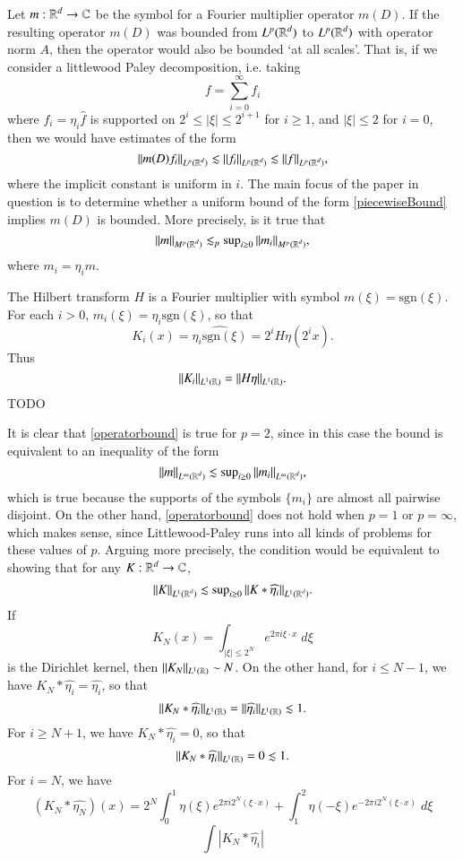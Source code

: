 Let $m: \operatorname{\mathbb{R}}^d \to \operatorname{\mathbb{C}}$ be the symbol for a Fourier multiplier operator $m(D)$. If the resulting operator $m(D)$ was bounded from $L^p(\operatorname{\mathbb{R}}^d)$ to $L^p(\operatorname{\mathbb{R}}^d)$ with operator norm $A$, then the operator would also be bounded `at all scales'. That is, if we consider a littlewood Paley decomposition, i.e. taking
%
\[ f = \sum_{i = 0}^\infty f_i \]
%
where $\widehat{f_i} = \eta_i \widehat{f}$ is supported on $2^i \leq |\xi| \leq 2^{i+1}$ for $i \geq 1$, and $|\xi| \leq 2$ for $i = 0$, then we would have estimates of the form
%
\begin{equation} \label{piecewiseBound}
    \| m(D) f_i \|_{L^p(\operatorname{\mathbb{R}}^d)} \lesssim \| f_i \|_{L^p(\operatorname{\mathbb{R}}^d)} \lesssim \| f \|_{L^p(\operatorname{\mathbb{R}}^d)},
\end{equation}
%
where the implicit constant is uniform in $i$. The main focus of the paper in question is to determine whether a uniform bound of the form \eqref{piecewiseBound} implies $m(D)$ is bounded. More precisely, is it true that
%
\begin{equation} \label{operatorbound}
    \| m \|_{M^p(\operatorname{\mathbb{R}}^d)} \lesssim_p \sup\nolimits_{i \geq 0} \| m_i \|_{M^p(\operatorname{\mathbb{R}}^d)},
\end{equation}
%
where $m_i = \eta_i m$.

The Hilbert transform $H$ is a Fourier multiplier with symbol $m(\xi) = \text{sgn}(\xi)$. For each $i > 0$, $m_i(\xi) = \eta_i \text{sgn}(\xi)$, so that
%
\[ K_i(x) = \widehat{\eta_i \text{sgn}(\xi)} = 2^i H \eta(2^i x). \]
%
Thus
%
\[ \| K_i \|_{L^1(\operatorname{\mathbb{R}})} = \| H \eta \|_{L^1(\operatorname{\mathbb{R}})}. \]
%
TODO

It is clear that \eqref{operatorbound} is true for $p = 2$, since in this case the bound is equivalent to an inequality of the form
%
\[ \| m \|_{L^\infty(\operatorname{\mathbb{R}}^d)} \lesssim \sup\nolimits_{i \geq 0} \| m_i \|_{L^\infty(\operatorname{\mathbb{R}}^d)}, \]
%
which is true because the supports of the symbols $\{ m_i \}$ are almost all pairwise disjoint. On the other hand, \eqref{operatorbound} does not hold when $p = 1$ or $p = \infty$, which makes sense, since Littlewood-Paley runs into all kinds of problems for these values of $p$. Arguing more precisely, the condition would be equivalent to showing that for any $K: \operatorname{\mathbb{R}}^d \to \operatorname{\mathbb{C}}$,
%
\[ \| K \|_{L^1(\operatorname{\mathbb{R}}^d)} \lesssim \sup\nolimits_{i \geq 0} \| K * \widehat{\eta_i} \|_{L^1(\operatorname{\mathbb{R}}^d)}. \]
%
If
%
\[ K_N(x) = \int_{|\xi| \leq 2^N} e^{2 \pi i \xi \cdot x}\; d\xi \]
%
is the Dirichlet kernel, then $\| K_N \|_{L^1(\operatorname{\mathbb{R}})} \sim N$. On the other hand, for $i \leq N-1$, we have $K_N * \widehat{\eta_i} = \widehat{\eta_i}$, so that
%
\[ \| K_N * \widehat{\eta_i} \|_{L^1(\operatorname{\mathbb{R}})} = \| \widehat{\eta_i} \|_{L^1(\operatorname{\mathbb{R}})} \lesssim 1. \]
%
For $i \geq N+1$, we have $K_N * \widehat{\eta_i} = 0$, so that
%
\[ \| K_N * \widehat{\eta_i} \|_{L^1(\operatorname{\mathbb{R}})} = 0 \lesssim 1. \]
%
For $i = N$, we have
%
\[ (K_N * \widehat{\eta_N})(x) = 2^N \int_0^1 \eta(\xi) e^{2 \pi i 2^N (\xi \cdot x)} + \int_1^2 \eta(-\xi) e^{-2 \pi i 2^N (\xi \cdot x)}\; d\xi  \]
%
\[ \int |K_N * \widehat{\eta_i}| \]

